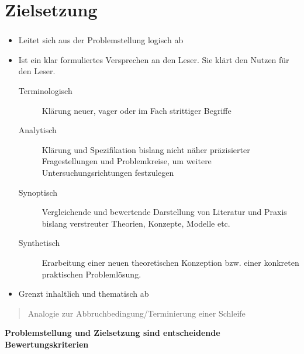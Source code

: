 \documentclass[aspectratio=169]{beamer}
\begin{document}
\section{Zielsetzung}
\begin{frame}
  \frametitle{\insertsection}%
  \framesubtitle{\insertsubsection}%
  \begin{itemize}
   \item Leitet sich aus der Problemstellung logisch ab
   \item Ist ein klar formuliertes Versprechen an den Leser. Sie klärt den Nutzen für den Leser.
   \begin{description}
    \item[Terminologisch] Klärung neuer, vager oder im Fach strittiger Begriffe
    \item[Analytisch] Klärung und Spezifikation bislang nicht näher präzisierter Fragestellungen und Problemkreise, um weitere Untersuchungsrichtungen festzulegen
    \item[Synoptisch] Vergleichende und bewertende Darstellung von Literatur und Praxis bislang verstreuter Theorien, Konzepte, Modelle etc.
    \item[Synthetisch] Erarbeitung einer neuen theoretischen Konzeption bzw. einer konkreten praktischen Problemlösung.
   \end{description}
   \item Grenzt inhaltlich und thematisch ab
  \end{itemize}
  \begin{quote}
   Analogie zur Abbruchbedingung/Terminierung einer Schleife
  \end{quote}
\end{frame}

\begin{frame}
\begin{center}
\textbf{\Huge Problemstellung und Zielsetzung sind entscheidende Bewertungskriterien}
\end{center}
\end{frame}
\end{document}
